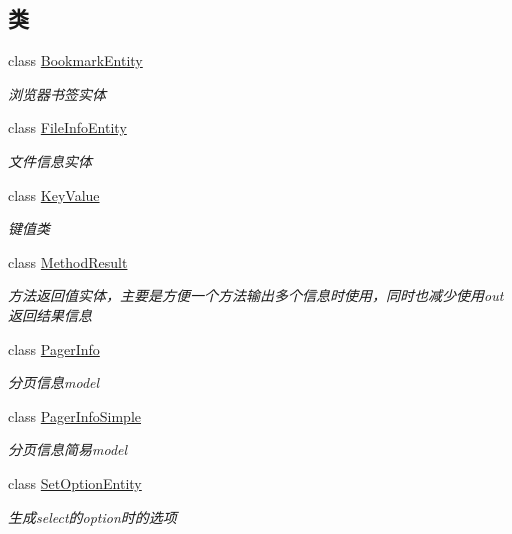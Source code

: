 \subsection*{类}
\begin{DoxyCompactItemize}
\item 
class \hyperlink{class_x_c_l_net_tools_1_1_entity_1_1_bookmark_entity}{Bookmark\+Entity}
\begin{DoxyCompactList}\small\item\em 浏览器书签实体 \end{DoxyCompactList}\item 
class \hyperlink{class_x_c_l_net_tools_1_1_entity_1_1_file_info_entity}{File\+Info\+Entity}
\begin{DoxyCompactList}\small\item\em 文件信息实体 \end{DoxyCompactList}\item 
class \hyperlink{class_x_c_l_net_tools_1_1_entity_1_1_key_value}{Key\+Value}
\begin{DoxyCompactList}\small\item\em 键值类 \end{DoxyCompactList}\item 
class \hyperlink{class_x_c_l_net_tools_1_1_entity_1_1_method_result}{Method\+Result}
\begin{DoxyCompactList}\small\item\em 方法返回值实体，主要是方便一个方法输出多个信息时使用，同时也减少使用out返回结果信息 \end{DoxyCompactList}\item 
class \hyperlink{class_x_c_l_net_tools_1_1_entity_1_1_pager_info}{Pager\+Info}
\begin{DoxyCompactList}\small\item\em 分页信息model \end{DoxyCompactList}\item 
class \hyperlink{class_x_c_l_net_tools_1_1_entity_1_1_pager_info_simple}{Pager\+Info\+Simple}
\begin{DoxyCompactList}\small\item\em 分页信息简易model \end{DoxyCompactList}\item 
class \hyperlink{class_x_c_l_net_tools_1_1_entity_1_1_set_option_entity}{Set\+Option\+Entity}
\begin{DoxyCompactList}\small\item\em 生成select的option时的选项 \end{DoxyCompactList}\item 

\end{DoxyCompactItemize}
